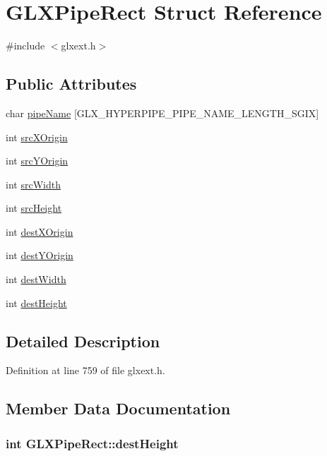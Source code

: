 \hypertarget{struct_g_l_x_pipe_rect}{
\section{GLXPipeRect Struct Reference}
\label{struct_g_l_x_pipe_rect}
}


{\ttfamily \#include $<$glxext.h$>$}

\subsection*{Public Attributes}
\begin{DoxyCompactItemize}
\item 
char \hyperlink{struct_g_l_x_pipe_rect_aa4c4f60e9647705ddefa10f95a37cb79}{pipeName} \mbox{[}GLX\_\-HYPERPIPE\_\-PIPE\_\-NAME\_\-LENGTH\_\-SGIX\mbox{]}
\item 
int \hyperlink{struct_g_l_x_pipe_rect_a9df2313c01f75d149e64f2ff467bc266}{srcXOrigin}
\item 
int \hyperlink{struct_g_l_x_pipe_rect_a1f7316dff7050ab2ce9d3d37f8c5450e}{srcYOrigin}
\item 
int \hyperlink{struct_g_l_x_pipe_rect_a2c6c180a4dabb71076366e06a1c7d0ef}{srcWidth}
\item 
int \hyperlink{struct_g_l_x_pipe_rect_a35632524bce6bffa05f284a9b1c1b8ff}{srcHeight}
\item 
int \hyperlink{struct_g_l_x_pipe_rect_a8b7b941894ad3420326d7e9fa885bb71}{destXOrigin}
\item 
int \hyperlink{struct_g_l_x_pipe_rect_aef7766b02ef07c20a11e89da5878b469}{destYOrigin}
\item 
int \hyperlink{struct_g_l_x_pipe_rect_a3c07991d2a8fb6e973eae834650b3dad}{destWidth}
\item 
int \hyperlink{struct_g_l_x_pipe_rect_a858b0ea6642e451495aff35cfefbd083}{destHeight}
\end{DoxyCompactItemize}


\subsection{Detailed Description}


Definition at line 759 of file glxext.h.



\subsection{Member Data Documentation}
\hypertarget{struct_g_l_x_pipe_rect_a858b0ea6642e451495aff35cfefbd083}{
\subsubsection[{destHeight}]{\setlength{\rightskip}{0pt plus 5cm}int {\bf GLXPipeRect::destHeight}}}
\label{struct_g_l_x_pipe_rect_a858b0ea6642e451495aff35cfefbd083}


